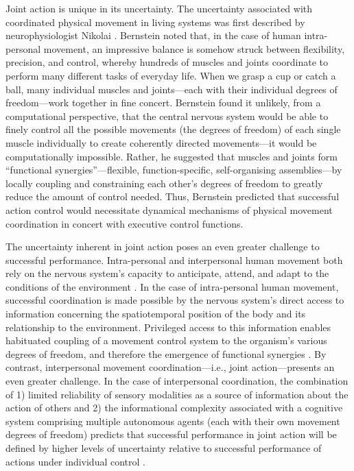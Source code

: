 \begin{CJK}{UTF8}{gbsn}
Joint action is unique in its uncertainty.  The uncertainty associated with coordinated physical movement in living systems was first described by neurophysiologist Nikolai \textcite{Bernstein1967}.  Bernstein noted that, in the case of human intra-personal movement, an impressive balance is somehow struck between flexibility, precision, and control, whereby hundreds of muscles and joints coordinate to perform many different tasks of everyday life.  When we grasp a cup or catch a ball, many individual muscles and joints---each with their individual degrees of freedom---work together in fine concert.  Bernstein found it unlikely, from a computational perspective, that the central nervous system would be able to finely control all the possible movements (the degrees of freedom) of each single muscle individually to create coherently directed movements---it would be computationally impossible.  Rather, he suggested that muscles and joints form  ``functional synergies''---flexible, function-specific, self-organising assemblies---by locally coupling and constraining each other's degrees of freedom to greatly reduce the amount of control needed.  Thus, Bernstein predicted that successful action control would necessitate dynamical mechanisms of physical movement coordination in concert with executive control functions.

The uncertainty inherent in joint action poses an even greater challenge to successful performance.  Intra-personal and interpersonal human movement both rely on the nervous system's capacity to anticipate, attend, and adapt to the conditions of the environment \citep{Keller2014}.  In the case of intra-personal human movement, successful coordination is made possible by the nervous system's direct access to information concerning the spatiotemporal position of the body and its relationship to the environment.  Privileged access to this information enables habituated coupling of a movement control system to the organism's various degrees of freedom, and therefore the emergence of functional synergies \citep{Riley2011}.  By contrast, interpersonal movement coordination---i.e., joint action---presents an even greater challenge.  In the case of interpersonal coordination, the combination of 1) limited reliability of sensory modalities as a source of information about the action of others \citep{Wilson2005,Wolpert2003,Frith2007} and 2) the informational complexity associated with a cognitive system comprising multiple autonomous agents (each with their own movement degrees of freedom) predicts that successful performance in joint action will be defined by higher levels of uncertainty relative to successful performance of actions under individual control \citep{Turvey1978}.


\end{CJK}
